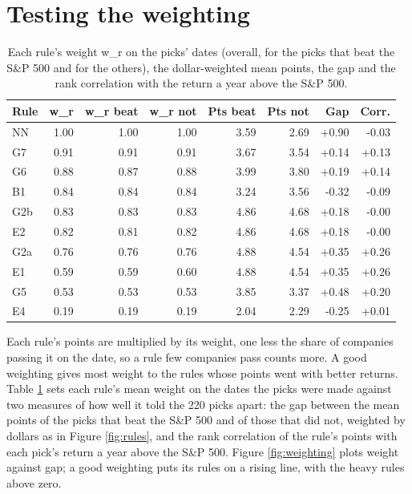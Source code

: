 \documentclass[11pt,a4paper]{article}
\begin{document}
\section{Testing the weighting}
\label{app:weighting}
\begin{table}[H]
\centering
\small
\caption{Each rule's weight w\_r on the picks' dates (overall, for the picks that beat the S\&P 500 and for the others), the dollar-weighted mean points, the gap and the rank correlation with the return a year above the S\&P 500.}\label{tab:weighting}
\begin{tabular}{l r r r r r r r}
\hline
Rule & w\_r & w\_r beat & w\_r not & Pts beat & Pts not & Gap & Corr. \\
\hline
NN & 1.00 & 1.00 & 1.00 & 3.59 & 2.69 & +0.90 & -0.03 \\
G7 & 0.91 & 0.91 & 0.91 & 3.67 & 3.54 & +0.14 & +0.13 \\
G6 & 0.88 & 0.87 & 0.88 & 3.99 & 3.80 & +0.19 & +0.14 \\
B1 & 0.84 & 0.84 & 0.84 & 3.24 & 3.56 & -0.32 & -0.09 \\
G2b & 0.83 & 0.83 & 0.83 & 4.86 & 4.68 & +0.18 & -0.00 \\
E2 & 0.82 & 0.81 & 0.82 & 4.86 & 4.68 & +0.18 & -0.00 \\
G2a & 0.76 & 0.76 & 0.76 & 4.88 & 4.54 & +0.35 & +0.26 \\
E1 & 0.59 & 0.59 & 0.60 & 4.88 & 4.54 & +0.35 & +0.26 \\
G5 & 0.53 & 0.53 & 0.53 & 3.85 & 3.37 & +0.48 & +0.20 \\
E4 & 0.19 & 0.19 & 0.19 & 2.04 & 2.29 & -0.25 & +0.01 \\
\hline
\end{tabular}
\end{table}
Each rule's points are multiplied by its weight, one less the share of companies passing it on the date, so a rule few companies pass counts more. A good weighting gives most weight to the rules whose points went with better returns. Table \ref{tab:weighting} sets each rule's mean weight on the dates the picks were made against two measures of how well it told the 220 picks apart: the gap between the mean points of the picks that beat the S\&P 500 and of those that did not, weighted by dollars as in Figure \ref{fig:rules}, and the rank correlation of the rule's points with each pick's return a year above the S\&P 500. Figure \ref{fig:weighting} plots weight against gap; a good weighting puts its rules on a rising line, with the heavy rules above zero.
\end{document}
